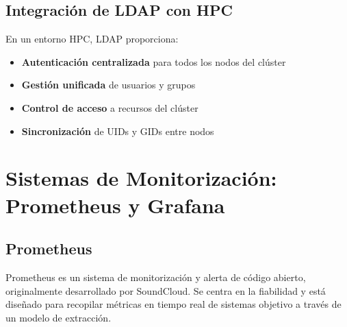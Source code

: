 \documentclass[12pt,a4paper]{report}
\begin{document}
\subsection{Integración de LDAP con HPC}

\begin{tcolorbox}[
  enhanced,
  colback=white,
  colframe=cientigo-green,
  arc=0mm,
  boxrule=1pt,
  title=Integración LDAP-HPC,
  attach boxed title to top center={yshift=-\tcboxedtitleheight/2},
  boxed title style={
    colback=cientigo-green,
    colframe=cientigo-green,
    fontupper=\bfseries\color{white},
  },
  coltitle=white,
  fonttitle=\bfseries
]
En un entorno HPC, LDAP proporciona:
\begin{itemize}
    \item \textbf{Autenticación centralizada} para todos los nodos del clúster
    \item \textbf{Gestión unificada} de usuarios y grupos
    \item \textbf{Control de acceso} a recursos del clúster
    \item \textbf{Sincronización} de UIDs y GIDs entre nodos
\end{itemize}
\end{tcolorbox}

\section{Sistemas de Monitorización: Prometheus y Grafana}

\subsection{Prometheus}

\begin{tcolorbox}[
  colback=cientigo-orange!10,
  colframe=cientigo-orange,
  arc=2mm,
  boxrule=0.5pt,
  title=\textbf{Prometheus},
  fonttitle=\bfseries\color{white},
  coltitle=cientigo-orange,
  attach boxed title to top center={yshift=-2mm},
  boxed title style={colback=cientigo-orange}
]
Prometheus es un sistema de monitorización y alerta de código abierto, originalmente desarrollado por SoundCloud. Se centra en la fiabilidad y está diseñado para recopilar métricas en tiempo real de sistemas objetivo a través de un modelo de extracción.
\end{tcolorbox}
\end{document}

